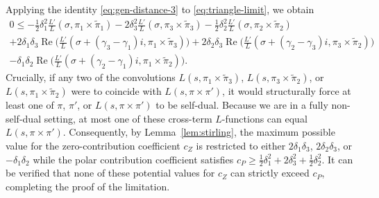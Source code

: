 \documentclass[12pt,reqno]{amsart}
\theoremstyle{remark}
\DeclareMathOperator{\Real}{Re}
\numberwithin{equation}{section}
\begin{document}
Applying the identity \eqref{eq:gen-distance-3} to \eqref{eq:triangle-limit}, we obtain
\begin{multline*}
0 \le -\frac{1}{2} \delta_1^2\frac{L'}{L}(\sigma, \pi_1\times\widetilde{\pi}_1) - 2\delta_3^2\frac{L'}{L}(\sigma, \pi_3\times\widetilde{\pi}_3)-\frac{1}{2} \delta_2^2\frac{L'}{L}(\sigma, \pi_2\times\widetilde{\pi}_2)\\
+2\delta_1\delta_3\Real\Big(\frac{L'}{L}(\sigma +(\gamma_3-\gamma_1)i, \pi_1 \times \widetilde{\pi}_3)\Big)
+2\delta_2\delta_3\Real\Big(\frac{L'}{L}(\sigma +(\gamma_2-\gamma_3)i, \pi_3 \times \widetilde{\pi}_2)\Big)\\
-\delta_1\delta_2\Real\Big(\frac{L'}{L}(\sigma +(\gamma_2-\gamma_1)i, \pi_1 \times \widetilde{\pi}_2)\Big).
\end{multline*}
Crucially, if any two of the convolutions $L(s, \pi_1 \times \widetilde{\pi}_3)$, $L(s, \pi_3 \times \widetilde{\pi}_2)$, or $L(s, \pi_1 \times \widetilde{\pi}_2)$ were to coincide with $L(s, \pi \times \pi')$, it would structurally force at least one of $\pi$, $\pi'$, or $L(s, \pi \times \pi')$ to be self-dual. Because we are in a fully non-self-dual setting, at most one of these cross-term $L$-functions can equal $L(s, \pi \times \pi')$. Consequently, by Lemma~\ref{lem:stirling}, the maximum possible value for the zero-contribution coefficient $c_Z$ is restricted to either $2\delta_1\delta_3$, $2\delta_2\delta_3$, or $-\delta_1\delta_2$ while the polar contribution coefficient satisfies $c_P \ge \frac{1}{2}\delta_1^2 + 2\delta_3^2 + \frac{1}{2}\delta_2^2$. It can be verified that none of these potential values for $c_Z$ can strictly exceed $c_P$, completing the proof of the limitation.
    
	
\end{document}
